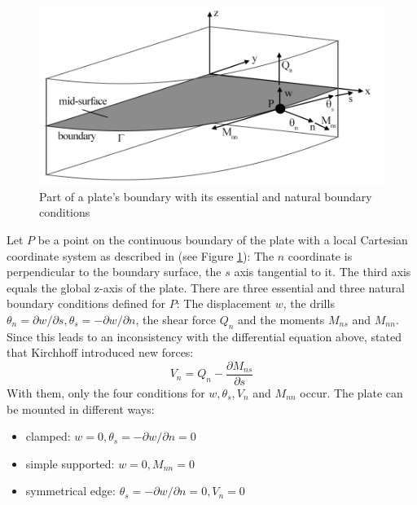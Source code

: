   \begin{figure} %
  	\centering
  	\includegraphics[width=0.97\linewidth]{figures/plate_boundary}
  	\caption{Part of a plate's boundary with its essential and natural boundary conditions}
  	\label{fig:plate_boundary}
  \end{figure}
  Let $P$ be a point on the continuous boundary of the plate with a local Cartesian coordinate system as described in \cite{steinke2005finite} (see Figure \ref{fig:plate_boundary}): The $n$ coordinate is perpendicular to the boundary surface, the $s$ axis tangential to it. The third axis equals the global z-axis of the plate. There are three essential and three natural boundary conditions defined for $P$: The displacement $w$, the drills $\theta_n = \partial w/\partial s, \theta_s = -\partial w/\partial n$, the shear force $Q_n$ and the moments $M_{ns}$ and $M_{nn}$. Since this leads to an inconsistency with the differential equation above, \cite{steinke2005finite} stated that Kirchhoff introduced new forces:
  \begin{equation}
  V_n = Q_n - \frac{\partial M_{ns}}{\partial s}
  \end{equation}
  With them, only the four conditions for $w, \theta_s, V_n$ and $M_{nn}$ occur.
  The plate can be mounted in different ways:
  \begin{itemize}
  	\item clamped: $w = 0, \theta_s = -\partial w/\partial n = 0$
  	\item simple supported: $w = 0, M_{nn} = 0$
  	\item symmetrical edge: $\theta_s = -\partial w/\partial n = 0, V_n = 0$
  \end{itemize}

